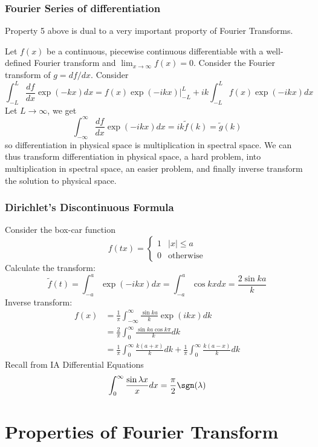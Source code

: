 \documentclass[a4paper]{article}
\newcommand*{\ft}{\tilde}
\begin{document}
\subsubsection{Fourier Series of differentiation}

Property 5 above is dual to a very important proporty of Fourier Transforms.

Let \(f(x)\) be a continuous, piecewise continuous differentiable with a well-defined Fourier transform and \(\lim_{x \to \infty} f(x) = 0\). Consider the Fourier transform of \(g = df/dx\). Consider
\[
  \int_{-L}^{L} \frac{df}{dx} \exp(-kx) dx = f(x) \exp(-ikx) \Big|_{-L}^{L} + ik \int_{-L}^{L} f(x) \exp(-ikx) dx
\]
Let \(L \to \infty\), we get
\[
  \int_{-\infty}^{\infty} \frac{df}{dx} \exp(-ikx) dx = ik \ft f(k) = \ft g(k)
\]
so differentiation in physical space is multiplication in spectral space. We can thus transform differentiation in physical space, a hard problem, into multiplication in spectral space, an easier problem, and finally inverse transform the solution to physical space.

\subsubsection{Dirichlet's Discontinuous Formula}

Consider the box-car function
\[
  f(tx) =
  \begin{cases}
    1 & |x| \leq a \\
    0 & \text{otherwise}
  \end{cases}
\]
Calculate the transform:
\[
  \ft f(t) = \int_{-a}^{a} \exp(-ikx) dx = \int_{-a}^{a} \cos kx dx = \frac{2\sin ka}{k}
\]
Inverse transform:
\begin{align*}
  f(x) &= \frac{1}{\pi} \int_{-\infty}^{\infty} \frac{\sin ka}{k} \exp(ikx) dk \\
       &= \frac{2}{\pi} \int_{0}^{\infty} \frac{\sin ka \cos k\pi}{k} dk \\
       &= \frac{1}{\pi} \int_{0}^{\infty} \frac{k (a + x)}{k} dk + \frac{1}{\pi} \int_{0}^{\infty} \frac{k (a - x)}{k} dk
\end{align*}
Recall from IA Differential Equations
\[
  \int_{0}^{\infty} \frac{\sin \lambda x}{x} dx = \frac{\pi}{2} \sgn(\lambda)
\]

\section{Properties of Fourier Transform}
\end{document}

